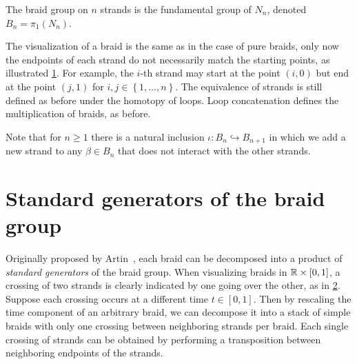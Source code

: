 \begin{definition}
    The braid group on $n$ strands is the fundamental group of $N_n$, denoted $B_n = \pi_1(N_n)$.
\end{definition}

The visualization of a braid is the same as in the case of pure braids, only now the endpoints of each strand do not necessarily match the starting points, as illustrated \cref{fig:C_general_braid}. For example, the $i$-th strand may start at the point $(i,0)$ but end at the point $(j,1)$ for $i,j\in\left\{ 1,\dots,n \right\}$. The equivalence of strands is still defined as before under the homotopy of loops. Loop concatenation defines the multiplication of braids, as before.

\begin{figure}[htbp]
    \centering
    
    \label{fig:C_general_braid}
\end{figure}

Note that for $n\geq 1$ there is a natural inclusion $\iota:B_n\hookrightarrow B_{n+1}$ in which we add a new strand to any $\beta\in B_n$ that does not interact with the other strands.

\section{Standard generators of the braid group}\label{sec:std_gens}
Originally proposed by Artin~\cite{Artin1947}, each braid can be decomposed into a product of \textit{standard generators} of the braid group. When visualizing braids in $\mathbb{R}\times[0,1]$, a crossing of two strands is clearly indicated by one going over the other, as in \cref{fig:Gen_on_Strands}. Suppose each crossing occurs at a different time $t\in[0,1]$. Then by rescaling the time component of an arbitrary braid, we can decompose it into a stack of simple braids with only one crossing between neighboring strands per braid. Each single crossing of strands can be obtained by performing a transposition between neighboring endpoints of the strands.

\begin{figure}[htbp]
    \centering
    
    \label{fig:Gen_on_Strands}
\end{figure}

